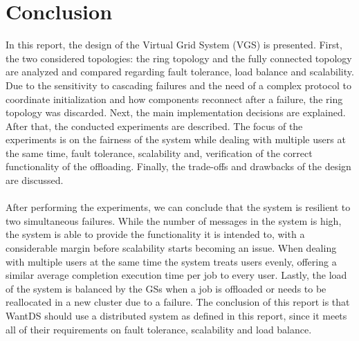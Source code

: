 \section{Conclusion}
In this report, the design of the Virtual Grid System (VGS) is presented. First, the two considered topologies: the ring topology and the fully connected topology are analyzed and compared regarding fault tolerance, load balance and scalability. Due to the sensitivity to cascading failures and the need of a complex protocol to coordinate initialization and how components reconnect after a failure, the ring topology was discarded. Next, the main implementation decisions are explained. After that, the conducted experiments are described. The focus of the experiments is on the fairness of the system while dealing with multiple users at the same time, fault tolerance, scalability and, verification of the correct functionality of the offloading. Finally, the trade-offs and drawbacks of the design are discussed.
\\\\
After performing the experiments, we can conclude that the system is resilient to two simultaneous failures. While the number of messages in the system is high, the system is able to provide the functionality it is intended to, with a considerable margin before scalability starts becoming an issue. When dealing with multiple users at the same time the system treats users evenly, offering a similar average completion execution time per job to every user. Lastly, the load of the system is balanced by the GSs when a job is offloaded or needs to be reallocated in a new cluster due to a failure. The conclusion of this report is that WantDS should use a distributed system as defined in this report, since it meets all of their requirements on fault tolerance, scalability and load balance.